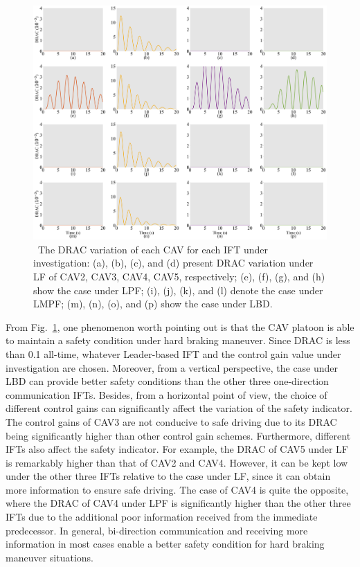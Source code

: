 \documentclass[a4paper]{cas-sc}
\begin{document}
\begin{figure}
  \centering
  \includegraphics[width=14cm]{figs/fig7.png}
  \caption{~The DRAC variation of each CAV for each IFT under investigation: (a), (b), (c), and (d) present DRAC variation under LF of CAV2, CAV3, CAV4, CAV5, respectively; (e), (f), (g), and (h) show the case under LPF; (i), (j), (k), and (l) denote the case under LMPF; (m), (n), (o), and (p) show the case under LBD.}
  \label{fig7}
\end{figure}

From Fig.~\ref{fig7}, one phenomenon worth pointing out is that the CAV platoon is able to maintain a safety condition under hard braking maneuver. Since DRAC is less than 0.1 all-time, whatever Leader-based IFT and the control gain value under investigation are chosen. Moreover, from a vertical perspective, the case under LBD can provide better safety conditions than the other three one-direction communication IFTs. Besides, from a horizontal point of view, the choice of different control gains can significantly affect the variation of the safety indicator. The control gains of CAV3 are not conducive to safe driving due to its DRAC being significantly higher than other control gain schemes. Furthermore, different IFTs also affect the safety indicator. For example, the DRAC of CAV5 under LF is remarkably higher than that of CAV2 and CAV4. However, it can be kept low under the other three IFTs relative to the case under LF, since it can obtain more information to ensure safe driving. The case of CAV4 is quite the opposite, where the DRAC of CAV4 under LPF is significantly higher than the other three IFTs due to the additional poor information received from the immediate predecessor. In general, bi-direction communication and receiving more information in most cases enable a better safety condition for hard braking maneuver situations.
\end{document}
